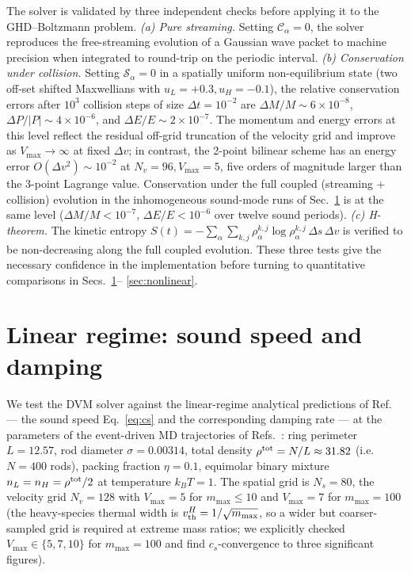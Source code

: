 \documentclass[aps,pre,twocolumn,superscriptaddress,longbibliography,floatfix]{revtex4-2}
\begin{document}
The solver is validated by three independent checks before
applying it to the GHD--Boltzmann problem. \emph{(a) Pure
streaming.} Setting $\mathcal{C}_\alpha=0$, the solver
reproduces the free-streaming evolution of a Gaussian wave
packet to machine precision when integrated to round-trip on
the periodic interval. \emph{(b) Conservation under
collision.} Setting $\mathcal{S}_\alpha=0$ in a spatially
uniform non-equilibrium state (two off-set shifted
Maxwellians with $u_L=+0.3,u_H=-0.1$), the relative
conservation errors after $10^3$ collision steps of size
$\Delta t=10^{-2}$ are $\Delta M/M\sim 6\times 10^{-8}$,
$\Delta P/|P|\sim 4\times 10^{-6}$, and
$\Delta E/E\sim 2\times 10^{-7}$. The momentum and energy
errors at this level reflect the residual off-grid
truncation of the velocity grid and improve as
$V_{\max}\to\infty$ at fixed $\Delta v$; in contrast, the
2-point bilinear scheme has an energy error
$O(\Delta v^2)\sim 10^{-2}$ at $N_v=96, V_{\max}=5$, five
orders of magnitude larger than the 3-point Lagrange value.
Conservation under the full coupled (streaming + collision)
evolution in the inhomogeneous sound-mode runs of
Sec.~\ref{sec:linear} is at the same level
($\Delta M/M<10^{-7}$, $\Delta E/E<10^{-6}$ over twelve sound
periods).
\emph{(c) H-theorem.} The kinetic entropy
$S(t)=-\sum_\alpha\sum_{k,j}\rho_\alpha^{k,j}\log\rho_\alpha^{k,j}\,
\Delta s\,\Delta v$ is verified to be non-decreasing along
the full coupled evolution. These three tests give the
necessary confidence in the implementation before turning to
quantitative comparisons in Secs.~\ref{sec:linear}--%
\ref{sec:nonlinear}.

\section{Linear regime: sound speed and damping}\label{sec:linear}

We test the DVM solver against the linear-regime analytical
predictions of Ref.~\cite{PaperIV} --- the sound speed
Eq.~\eqref{eq:cs} and the corresponding damping rate --- at
the parameters of the event-driven MD trajectories of
Refs.~\cite{PaperII,PaperIII}: ring perimeter
$L=12.57$, rod diameter $\sigma=0.00314$, total density
$\rho^{\rm tot}=N/L\approx 31.82$ (i.e.\ $N=400$ rods),
packing fraction $\eta=0.1$, equimolar binary mixture
$n_L=n_H=\rho^{\rm tot}/2$ at temperature $k_BT=1$. The
spatial grid is $N_s=80$, the velocity grid $N_v=128$ with
$V_{\max}=5$ for $m_{\max}\leq 10$ and $V_{\max}=7$ for
$m_{\max}=100$ (the heavy-species thermal width is
$v_{\rm th}^H=1/\sqrt{m_{\max}}$, so a wider but coarser-%
sampled grid is required at extreme mass ratios; we
explicitly checked $V_{\max}\in\{5,7,10\}$ for
$m_{\max}=100$ and find $c_s$-convergence to three
significant figures).
\end{document}
